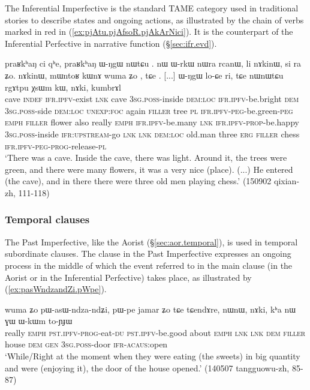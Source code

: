 The Inferential Imperfective is the standard TAME category used in traditional stories to describe states and ongoing actions, as illustrated by the chain of verbs marked in red in (\ref{ex:pjAtu.pjAfsoR.pjAkArNici}). It is the counterpart of the Inferential Perfective in narrative function  (§\ref{sec:ifr.evd}).

\begin{exe}
\ex \label{ex:pjAtu.pjAfsoR.pjAkArNici}
\gll praʁkʰaŋ ci  qʰe, praʁkʰaŋ ɯ-ŋgɯ nɯtɕu . nɯ ɯ-rkɯ nɯra rcanɯ, li nɤkinɯ, si ra  ʑo. nɤkinɯ, mɯntoʁ kɯnɤ wuma ʑo , tɕe . [...] ɯ-ŋgɯ lo-ɕe ri, tɕe nɯnɯtɕu rgɤtpu χsɯm kɯ, nɤki, kumbrɤl  \\
cave \textsc{indef} \textsc{ifr}.\textsc{ipfv}-exist \textsc{lnk} cave \textsc{3sg}.\textsc{poss}-inside \textsc{dem}:\textsc{loc} \textsc{ifr}.\textsc{ipfv}-be.bright \textsc{dem} \textsc{3sg}.\textsc{poss}-side \textsc{dem}:\textsc{loc} \textsc{unexp}:\textsc{foc} again \textsc{filler} tree \textsc{pl} \textsc{ifr}.\textsc{ipfv}-\textsc{peg}-be.green-\textsc{peg} \textsc{emph} \textsc{filler} flower also really \textsc{emph} \textsc{ifr}.\textsc{ipfv}-be.many \textsc{lnk} \textsc{ifr}.\textsc{ipfv}-\textsc{prop}-be.happy { } \textsc{3sg}.\textsc{poss}-inside \textsc{ifr}:\textsc{upstream}-go \textsc{lnk} \textsc{lnk} \textsc{dem}:\textsc{loc} old.man three \textsc{erg} \textsc{filler} chess \textsc{ifr}.\textsc{ipfv}-\textsc{peg}-\textsc{prog}-release-\textsc{pl} \\
\glt `There was a cave. Inside the cave, there was light. Around it, the trees were green, and there were many flowers, it was a very nice (place). (...) He entered (the cave), and in there there were three old men playing chess.' (150902 qixian-zh, 111-118)
\end{exe}


\subsubsection{Temporal clauses} \label{sec:pst.ifr.ipfv.temporal}
The Past Imperfective, like the Aorist (§\ref{sec:aor.temporal}), is used in temporal subordinate clauses. The clause in the Past Imperfective expresses an ongoing process in the middle of which the event referred to in the main clause (in the Aorist or in the Inferential Perfective) takes place, as illustrated by (\ref{ex:pasWndzandZi.pWpe}).

\begin{exe}
\ex \label{ex:pasWndzandZi.pWpe}
\gll wuma ʑo pɯ-asɯ-ndza-ndʑi,  pɯ-pe jamar ʑo tɕe tɕendɤre, nɯnɯ, nɤki, kʰa nɯ ɣɯ ɯ-kɯm to-ɲɟɯ\\
really \textsc{emph} \textsc{pst}.\textsc{ipfv}-\textsc{prog}-eat-\textsc{du} \textsc{pst}.\textsc{ipfv}-be.good about \textsc{emph} \textsc{lnk} \textsc{lnk} \textsc{dem} \textsc{filler} house \textsc{dem} \textsc{gen} \textsc{3sg}.\textsc{poss}-door \textsc{ifr}-\textsc{acaus}:open\\
\glt `While/Right at the moment when they were eating (the sweets) in big quantity and were (enjoying it), the door of the house opened.' (140507 tangguowu-zh, 85-87)
\end{exe}

